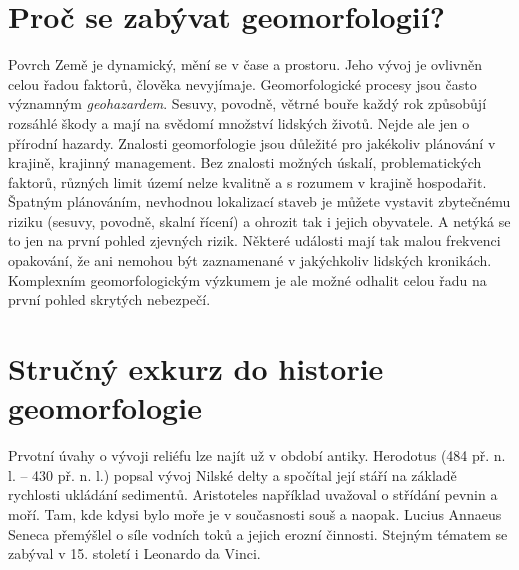 \section{Proč se zabývat geomorfologií?}
Povrch Země je dynamický, mění se v čase a prostoru. Jeho vývoj je ovlivněn celou řadou faktorů, člověka nevyjímaje. Geomorfologické procesy jsou často významným \emph{geohazardem}. Sesuvy, povodně, větrné bouře každý rok způsobůjí rozsáhlé škody a mají na svědomí množství lidských životů. Nejde ale jen o přírodní hazardy. Znalosti geomorfologie jsou důležité pro jakékoliv plánování v krajině, krajinný management. Bez znalosti možných úskalí, problematických faktorů, různých limit území nelze kvalitně a s rozumem v krajině hospodařit. Špatným plánováním, nevhodnou lokalizací staveb je můžete vystavit zbytečnému riziku (sesuvy, povodně, skalní řícení) a ohrozit tak i jejich obyvatele. 
A netýká se to jen na první pohled zjevných rizik. Některé události mají tak malou frekvenci opakování, že ani nemohou být zaznamenané v jakýchkoliv lidských kronikách. Komplexním geomorfologickým výzkumem je ale možné odhalit celou řadu na první pohled skrytých nebezpečí.



\section{Stručný exkurz do historie geomorfologie}
Prvotní úvahy o vývoji reliéfu lze najít už v období antiky. Herodotus (484 př. n. l. -- 430 př. n. l.) popsal vývoj Nilské delty a spočítal její stáří na základě rychlosti ukládání sedimentů. Aristoteles například uvažoval o střídání pevnin a moří. Tam, kde kdysi bylo moře je v současnosti souš a naopak. Lucius Annaeus Seneca přemýšlel o síle vodních toků a jejich erozní činnosti. Stejným tématem se zabýval v 15. století i Leonardo da Vinci.

